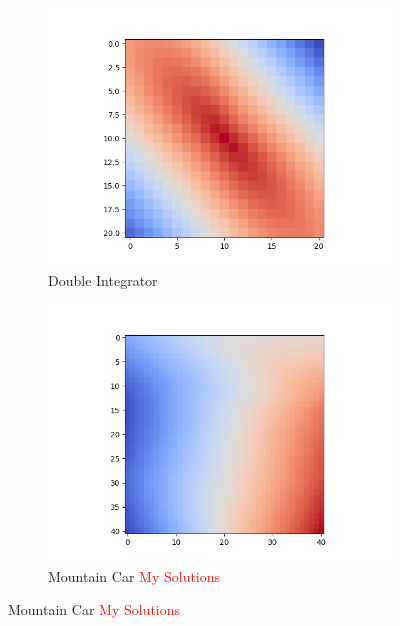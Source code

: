 \documentclass{article}
\begin{document}
\begin{enumerate}[(a)]
\begin{figure}[h!]
    \centering
    \begin{subfigure}{0.45\textwidth}
        \centering
        \includegraphics[width=\textwidth]{figures/part_3_a_a.png}
        \caption{Double Integrator}
    \end{subfigure}
    \hspace{0.2 in}
    \begin{subfigure}{0.45\textwidth}
        \centering
        \includegraphics[width=\textwidth]{figures/part_3_a_b.png}
        \caption{Mountain Car \textcolor{red}{My Solutions}}
    \end{subfigure}
\end{figure}


\end{enumerate}
\end{document}
